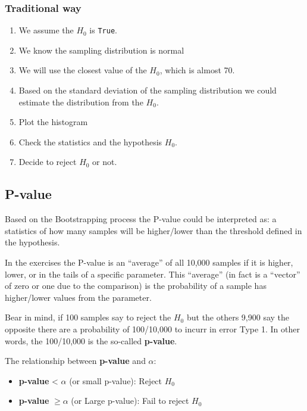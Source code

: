 \documentclass[]{book}
\providecommand{\tightlist}{%
  \setlength{\itemsep}{0pt}\setlength{\parskip}{0pt}}
\begin{document}
\subsubsection{Traditional way}\label{traditional-way}

\begin{enumerate}
\def\labelenumi{\arabic{enumi}.}
\tightlist
\item
  We assume the \(H_0\) is \texttt{True}.
\item
  We know the sampling distribution is normal
\item
  We will use the closest value of the \(H_0\), which is almost 70.
\item
  Based on the standard deviation of the sampling distribution we could
  estimate the distribution from the \(H_0\).
\item
  Plot the histogram
\item
  Check the statistics and the hypothesis \(H_0\).
\item
  Decide to reject \(H_0\) or not.
\end{enumerate}

\subsection{P-value}\label{p-value}

Based on the Bootstrapping process the P-value could be interpreted as:
a statistics of how many samples will be higher/lower than the threshold
defined in the hypothesis.

In the exercises the P-value is an ``average'' of all 10,000 samples if
it is higher, lower, or in the tails of a specific parameter. This
``average'' (in fact is a ``vector'' of zero or one due to the
comparison) is the probability of a sample has higher/lower values from
the parameter.

Bear in mind, if 100 samples say to reject the \(H_0\) but the others
9,900 say the opposite there are a probability of 100/10,000 to incurr
in error Type 1. In other words, the 100/10,000 is the so-called
\textbf{p-value}.

The relationship between \textbf{p-value} and \(\alpha\):

\begin{itemize}
\tightlist
\item
  \textbf{p-value} \textless{} \(\alpha\) (or small p-value): Reject
  \(H_0\)
\item
  \textbf{p-value} \(\geq \alpha\) (or Large p-value): Fail to reject
  \(H_0\)
\end{itemize}
\end{document}
